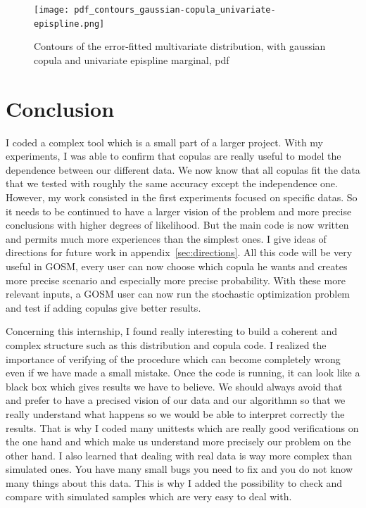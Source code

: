 \documentclass{article}
\begin{document}
\begin{figure}[H]
    \texttt{[image: pdf\_contours\_gaussian-copula\_univariate-epispline.png]}
    \centering
    \caption{Contours of the error-fitted multivariate distribution, with gaussian copula and univariate epispline marginal, pdf}
\end{figure}

  



\newpage


\section*{Conclusion}

	
	I coded a complex tool which is a small part of a larger project. With my experiments, I was able to confirm that copulas are really useful to model the dependence between our different data. We now know that all copulas fit the data that we tested with roughly the same accuracy except the independence one. However, my work consisted in the first experiments focused on specific datas. So it needs to be continued to have a larger vision of the problem and more precise conclusions with higher degrees of likelihood. But the main code is now written and permits much more experiences than the simplest ones. I give ideas of directions for future work in appendix~\ref{sec:directions}. All this code will be very useful in GOSM, every user can now choose which copula he wants and creates more precise scenario and especially more precise probability. With these more relevant inputs, a GOSM user can now run the stochastic optimization problem and test if adding copulas give better results.
	 
	Concerning this internship, I found really interesting to build a coherent and complex structure such as this distribution and copula code. I realized the importance of verifying of the procedure which can become completely wrong even if we have made a small mistake. Once the code is running, it can look like a black box which gives results we have to believe. We should always avoid that and prefer to have a precised vision of our data and our algorithmn so that we really understand what happens so we would be able to interpret correctly the results. That is why I coded many unittests which are really good verifications on the one hand and which make us understand more precisely our problem on the other hand. I also learned that dealing with real data is way more complex than simulated ones. You have many small bugs you need to fix and you do not know many things about this data. This is why I added the possibility to check and compare with simulated samples which are very easy to deal with.
	
\end{document}

